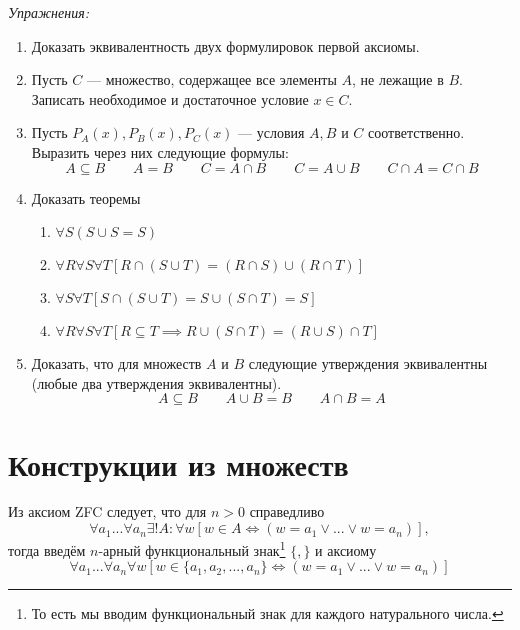 \newcommand\eset{\varnothing}
\vspace{1em}
{\it Упражнения:}
\begin{enumerate}
	\item{}Доказать эквивалентность двух формулировок первой аксиомы.

	\item{}Пусть $C$ --- множество, содержащее все элементы $A$, не лежащие в $B$.
	Записать необходимое и достаточное условие $x\in C$.

	\item{}Пусть $P_{A}(x), P_{B}(x),P_{C}(x)$ --- условия $A,B$ и $C$ соответственно.
	Выразить через них следующие формулы:
	\[
		A\subseteq B\qquad A=B\qquad
		C=A\cap B\qquad C=A\cup B\qquad
		C\cap A=C\cap B
	\]

	\item{}Доказать теоремы
	\begin{fullwidth}
		\begin{multicols}{2}
			\begin{enumerate}
				\item{}$\forall S(S\cup S=S)$
				\item{}$\forall R\forall S\forall T[R\cap (S\cup T)=(R\cap S)\cup (R\cap T)]$
				\item{}$\forall S\forall T[S\cap (S\cup T)=S\cup (S\cap T)=S]$
				\item{}$\forall R\forall S\forall T[R\subseteq T
							\implies R\cup (S\cap T)=(R\cup S)\cap T]$
			\end{enumerate}
		\end{multicols}
	\end{fullwidth}


	\item{}Доказать, что для множеств $A$ и $B$ следующие утверждения эквивалентны
	(любые два утверждения эквивалентны).
	\[
		A\subseteq B\qquad A\cup B=B\qquad A\cap B=A
	\]
\end{enumerate}

\section{Конструкции из множеств}

Из аксиом ZFC следует, что для $n>0$ справедливо
\[
	\forall a_1...\forall a_{n}\exists !A:\forall w
		[w\in A\iff (w=a_1\lor...\lor w=a_{n})],
\]
тогда введём $n$-арный функциональный знак\footnote{
	То есть мы вводим функциональный знак для каждого натурального числа.}
$\{,\}$ и аксиому
\[
	\forall a_1...\forall a_{n}\forall w
	[w\in \{a_1,a_2,...,a_{n}\}\iff (w=a_1\lor ...\lor w=a_{n})]
\]


